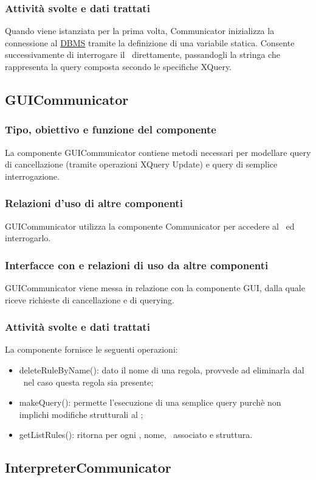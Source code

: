 \subsubsection{Attivit\`a svolte e dati trattati}
Quando viene istanziata per la prima volta, Communicator inizializza la connessione al \underline{DBMS} tramite la definizione di una variabile statica. Consente successivamente di interrogare il \rp\ direttamente, passandogli la stringa che rappresenta la query composta secondo le specifiche XQuery.
%
\subsection{GUICommunicator}
\subsubsection{Tipo, obiettivo e funzione del componente}
La componente GUICommunicator contiene metodi necessari per modellare query di cancellazione (tramite operazioni XQuery Update) e query di semplice interrogazione.
\subsubsection{Relazioni d'uso di altre componenti}
GUICommunicator utilizza la componente Communicator per accedere al \rp\ ed interrogarlo.
\subsubsection{Interfacce con e relazioni di uso da altre componenti}
GUICommunicator viene messa in relazione con la componente GUI, dalla quale riceve richieste di cancellazione e di querying.
\subsubsection{Attivit\`a svolte e dati trattati}
La componente fornisce le seguenti operazioni:
\begin{itemize}
 \item deleteRuleByName(): dato il nome di una regola, provvede ad eliminarla dal \rp\ nel caso questa regola sia presente;
 \item makeQuery(): permette l'esecuzione di una semplice query purch\`e non implichi modifiche strutturali al \rp;
 \item getListRules(): ritorna per ogni \br, nome, \bo\ associato e struttura.
\end{itemize}
\subsection{InterpreterCommunicator}
